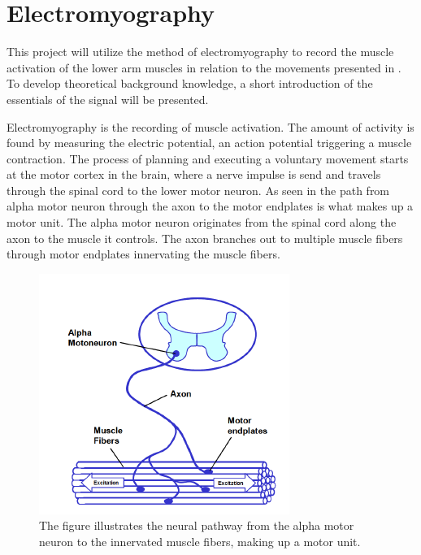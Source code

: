 \section{Electromyography} \label{sec:BG:EMG}

This project will utilize the method of electromyography to record the muscle activation of the lower arm muscles in relation to the movements presented in . To develop theoretical background knowledge, a short introduction of the essentials of the signal will be presented. 

Electromyography is the recording of muscle activation. The amount of activity is found by measuring the electric potential, an action potential triggering a muscle contraction. The process of planning and executing a voluntary movement starts at the motor cortex in the brain, where a nerve impulse is send and travels through the spinal cord to the lower motor neuron. As seen in  the path from alpha motor neuron through the axon to the motor endplates is what makes up a motor unit. The alpha motor neuron originates from the spinal cord along the axon to the muscle it controls. The axon branches out to multiple muscle fibers through motor endplates innervating the muscle fibers.

\begin{figure}[H]                                         
	\includegraphics[width=.4\textwidth]{figures/motor_unit}  
	\caption{The figure illustrates the neural pathway from the alpha motor neuron to the innervated muscle fibers, making up a motor unit. \cite{Konrad2005}}
	\label{fig:motor} 
\end{figure}  

